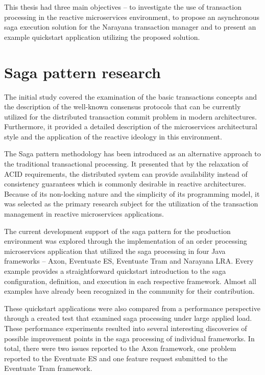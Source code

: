 \documentclass[oneside,
  digital, %
  table,   %
  lof,     %
  lot,     %
]{fithesis3}
\begin{document}
This thesis had three main objectives -- to investigate the use of transaction processing in the reactive microservices environment, to propose an asynchronous saga execution solution for the Narayana transaction manager and to present an example quickstart application utilizing the proposed solution.

\section{Saga pattern research}

The initial study covered the examination of the basic transactions concepts and the description of the well-known consensus protocols that can be currently utilized for the distributed transaction commit problem in modern architectures. Furthermore, it provided a detailed description of the microservices architectural style and the application of the reactive ideology in this environment.

The Saga pattern \cite{sagas_publ} methodology has been introduced as an alternative approach to the traditional transactional processing. It presented that by the relaxation of ACID requirements, the distributed system can provide availability instead of consistency guarantees which is commonly desirable in reactive architectures. Because of its non-locking nature and the simplicity of its programming model, it was selected as the primary research subject for the utilization of the transaction management in reactive microservices applications.

The current development support of the saga pattern for the production environment was explored through the implementation of an order processing microservices application that utilized the saga processing in four Java frameworks -- Axon, Eventuate ES, Eventuate Tram and Narayana LRA. Every example provides a straightforward quickstart introduction to the saga configuration, definition, and execution in each respective framework. Almost all examples have already been recognized in the community for their contribution.

These quickstart applications were also compared from a performance perspective through a created test that examined saga processing under large applied load. These performance experiments resulted into several interesting discoveries of possible improvement points in the saga processing of individual frameworks. In total, there were two issues reported to the Axon framework, one problem reported to the Eventuate ES and one feature request submitted to the Eventuate Tram framework.
\end{document}
